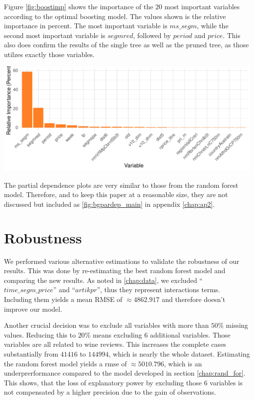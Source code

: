 \documentclass[11pt,]{article}
\let\origfigure\figure
\let\endorigfigure\endfigure
\renewenvironment{figure}[1][2] {
    \expandafter\origfigure\expandafter[H]
} {
    \endorigfigure
}
\begin{document}
Figure \ref{fig:boostimp} shows the importance of the \(20\) most
important variables according to the optimal boosting model. The values
shown is the relative importance in percent. The most important variable
is \(ms\_segm\), while the second most important variable is
\(segmred\), followed by \(period\) and \(price\). This also does
confirm the results of the single tree as well as the pruned tree, as
those utilzes exactly those variables.

\begin{figure}
\centering
\includegraphics{../00_data/output_paper/12_var_imp_boosting_bp.pdf}
\caption{\label{fig:boostimp}Boosting: Variable Importance Plot.}
\end{figure}

The partial dependence plots are very similar to those from the random
forest model. Therefore, and to keep this paper at a reasonable size,
they are not discussed but included as \ref{fig:bgpardep_main} in
appendix \ref{chap:ap2}.

\hypertarget{robustness}{%
\section{Robustness}\label{robustness}}

We performed various alternative estimations to validate the robustness
of our results. This was done by re-estimating the best random forest
model and comparing the new results. As noted in \autoref{chap:data}, we
excluded \enquote{\(time\_segm\_price\)} and \enquote{\(artikpr\)}, thus
they represent interactions terms. Including them yields a mean
\ac{RMSE} of \(\approx4862.917\) and therefore doesn't improve our
model.

Another crucial decision was to exclude all variables with more than
\(50\%\) missing values. Reducing this to \(20\%\) means excluding \(6\)
additional variables. Those variables are all related to wine reviews.
This increases the complete cases substantially from \(41416\) to
\(144994\), which is nearly the whole dataset. Estimating the random
forest model yields a \ac{rmse} of \(\approx5010.796\), which is an
underprerformance compared to the model developed in section
\ref{chap:rand_for}. This shows, that the loss of explanatory power by
excluding those \(6\) variables is not compensated by a higher precision
due to the gain of observations.
\end{document}
